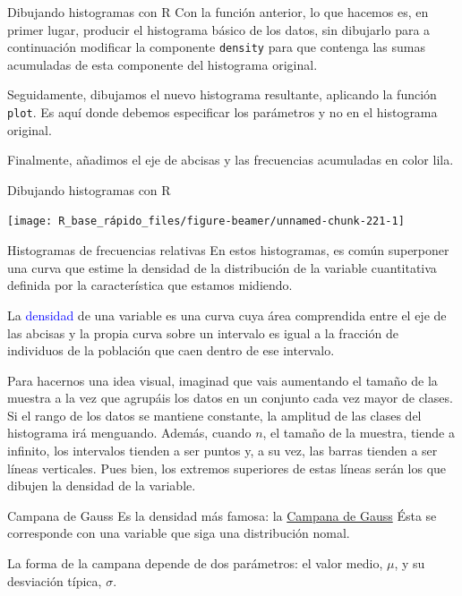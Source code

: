 \documentclass[
  ignorenonframetext,
  aspectratio=169]{beamer}
\newcommand\blue[1]{\textcolor{blue}{#1}}
\begin{document}
\begin{frame}[fragile]{Dibujando histogramas con R}
\label{dibujando-histogramas-con-r-8}
Con la función anterior, lo que hacemos es, en primer lugar, producir el
histograma básico de los datos, sin dibujarlo para a continuación
modificar la componente \texttt{density} para que contenga las sumas
acumuladas de esta componente del histograma original.

Seguidamente, dibujamos el nuevo histograma resultante, aplicando la
función \texttt{plot}. Es aquí donde debemos especificar los parámetros
y no en el histograma original.

Finalmente, añadimos el eje de abcisas y las frecuencias acumuladas en
color lila.
\end{frame}

\begin{frame}{Dibujando histogramas con R}
\label{dibujando-histogramas-con-r-9}
\begin{center}\texttt{[image: R\_base\_rápido\_files/figure-beamer/unnamed-chunk-221-1]} \end{center}
\end{frame}

\begin{frame}{Histogramas de frecuencias relativas}
\label{histogramas-de-frecuencias-relativas}
En estos histogramas, es común superponer una curva que estime la
densidad de la distribución de la variable cuantitativa definida por la
característica que estamos midiendo.

La \blue{densidad} de una variable es una curva cuya área comprendida
entre el eje de las abcisas y la propia curva sobre un intervalo es
igual a la fracción de individuos de la población que caen dentro de ese
intervalo.

Para hacernos una idea visual, imaginad que vais aumentando el tamaño de
la muestra a la vez que agrupáis los datos en un conjunto cada vez mayor
de clases. Si el rango de los datos se mantiene constante, la amplitud
de las clases del histograma irá menguando. Además, cuando \(n\), el
tamaño de la muestra, tiende a infinito, los intervalos tienden a ser
puntos y, a su vez, las barras tienden a ser líneas verticales. Pues
bien, los extremos superiores de estas líneas serán los que dibujen la
densidad de la variable.
\end{frame}

\begin{frame}{Campana de Gauss}
\label{campana-de-gauss}
Es la densidad más famosa: la
\href{https://es.wikipedia.org/wiki/Función_gaussiana}{Campana de Gauss}
Ésta se corresponde con una variable que siga una distribución nomal.

La forma de la campana depende de dos parámetros: el valor medio,
\(\mu\), y su desviación típica, \(\sigma\).
\end{frame}
\end{document}
